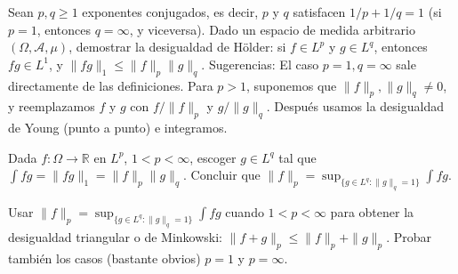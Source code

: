 \begin{problem}[5]Sean $p,q \ge 1$ exponentes conjugados, es decir, $p$ y $q$ satisfacen
$1/p + 1/q =1$ (si $p=1$, entonces $q = \infty$, y viceversa).
Dado un espacio de medida arbitrario $(\Omega, \mathcal{A}, \mu)$, demostrar la desigualdad de
H\"older: si $f\in L^p$ y $g\in L^q$, entonces $fg\in L^1$, y $\|fg\|_1 \le \|f\|_p\|g\|_q$.
Sugerencias: El caso $p=1, q=\infty$ sale directamente de las definiciones.
Para $p >1$, suponemos que  $\|f\|_p, \|g\|_q\ne 0$, y reemplazamos 
$f$ y $g$ con 
 $f/\|f\|_p$ y $g/\|g\|_q$.  Despu\'es usamos la desigualdad de Young (punto a
punto) e integramos.
\solution

\begin{expla}

\end{expla}

\end{problem}


\begin{problem}[6] Dada $f:\Omega\to \mathbb{R}$ en $L^p$,  $1 < p <  \infty$, escoger $g\in L^q$ tal que
$\int fg = \|fg\|_1 = \|f\|_p\|g\|_q$. Concluir que 
$\|f\|_p= \operatorname{sup}_{\{g\in L^q: \|g\|_q=1\}} \int fg $.
\solution

\begin{expla}

\end{expla}

\end{problem}


\begin{problem}[7]Usar $\|f\|_p= \operatorname{sup}_{\{g\in L^q: \|g\|_q=1\}} \int fg $ cuando $1 < p <  \infty$
para obtener la desigualdad triangular o de Minkowski: $\|f + g\|_p \le \|f\|_p + \|g\|_p$.
Probar tambi\'en los casos (bastante obvios) $p=1$  y  $p = \infty$.
\solution

\begin{expla}

\end{expla}

\end{problem}

